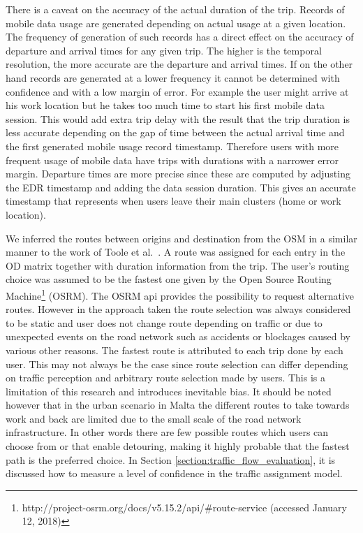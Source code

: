 \documentclass[12pt, a4paper]{report}
\theoremstyle{definition}
\theoremstyle{definition}%
\theoremstyle{definition}%
\theoremstyle{definition}%
\theoremstyle{definition}%
\theoremstyle{definition}%
\begin{document}
There is a caveat on the accuracy of the actual duration of the trip. Records of mobile data usage are generated depending on actual usage at a given location. The frequency of generation of such records has a direct effect on the accuracy of departure and arrival times for any given trip. The higher is the temporal resolution, the more accurate are the departure and arrival times. If on the other hand records are generated at a lower frequency it cannot be determined with confidence and with a low margin of error. For example the user might arrive at his work location but he takes too much time to start his first mobile data session. This would add extra trip delay with the result that the trip duration is less accurate depending on the gap of time between the actual arrival time and the first generated mobile usage record timestamp. Therefore users with more frequent usage of mobile data have trips with durations with a narrower error margin. Departure times are more precise since these are computed by adjusting the EDR timestamp and adding the data session duration. This gives an accurate timestamp that represents when users leave their main clusters (home or work location).   

We inferred the routes between origins and destination from the OSM in a similar manner to the work of Toole et al.\ \cite{Toole2015}. A route was assigned for each entry in the OD matrix together with duration information from the trip. The user's routing choice was assumed to be the fastest one given by the Open Source Routing Machine\footnote{http://project-osrm.org/docs/v5.15.2/api/\#route-service (accessed January 12, 2018)} (OSRM). The OSRM api provides the possibility to request alternative routes. However in the approach taken the route selection was always considered to be static and user does not change route depending on traffic or due to  unexpected events on the road network such as accidents or blockages caused by various other reasons. The fastest route is attributed to each trip done by each user. This may not always be the case since route selection can differ depending on traffic perception and arbitrary route selection made by users. This is a limitation of this research and introduces inevitable bias. It should be noted however that in the urban scenario in Malta the different routes to take towards work and back are limited due to the small scale of the road network infrastructure. In other words there are few possible routes which users can choose from or that enable detouring, making it highly probable that the fastest path is the preferred choice. In Section \ref{section:traffic_flow_evaluation}, it is discussed how to measure a level of confidence in the traffic assignment model.
\end{document}
